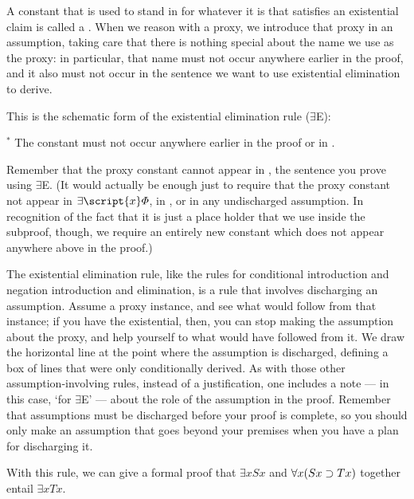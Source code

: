 A constant that is used to stand in for whatever it is that satisfies an existential claim is called a . When we reason with a proxy, we introduce that proxy in an assumption, taking care that there is nothing special about the name we use as the proxy: in particular, that name must not occur anywhere earlier in the proof, and it also must not occur in the sentence we want to use existential elimination to derive.

This is the schematic form of the existential elimination rule ($\exists$E): 

\begin{ndproof}
	\open	
		 
	\close
	 
\end{ndproof}
$^\ast$ The constant  must not occur anywhere earlier in the proof or in \metaB{}.

Remember that the proxy constant cannot appear in \metaB{}, the sentence you prove using $\exists$E. (It would actually be enough just to require that the proxy constant not appear in $\exists\script{x}\metaA{}$, in \metaB{}, or in any undischarged assumption. In recognition of the fact that it is just a place holder that we use inside the subproof, though, we require an entirely new constant which does not appear anywhere above in the proof.)

The existential elimination rule, like the rules for conditional introduction and negation introduction and elimination, is a rule that involves discharging an assumption. Assume a proxy instance, and see what would follow from that instance; if you have the existential, then, you can stop making the assumption about the proxy, and help yourself to what would have followed from it. We draw the horizontal line at the point where the assumption is discharged, defining a box of lines that were only conditionally derived. As with those other assumption-involving rules, instead of a justification, one includes a note --- in this case, `for $\exists${}E' --- about the role of the assumption in the proof. Remember that assumptions must be discharged before your proof is complete, so you should only make an assumption that goes beyond your premises when you have a plan for discharging it.


With this rule, we can give a formal proof that $\exists x Sx$ and $\forall x(Sx \supset Tx)$ together entail $\exists x Tx$.

